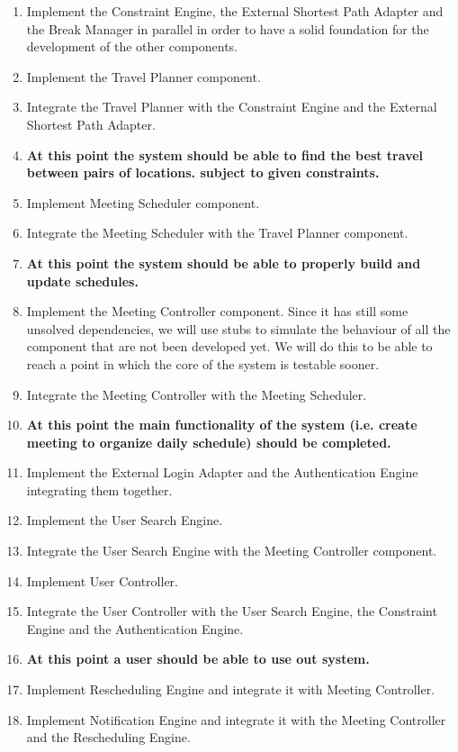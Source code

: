 \begin{enumerate}
	
	\item Implement the Constraint Engine, the External Shortest Path Adapter and the Break Manager in parallel in order to have a solid foundation for the development of the other components.
	\item Implement the Travel Planner component.
	\item Integrate the Travel Planner with the Constraint Engine and the External Shortest Path Adapter.
	 \item[ ]
	\textbf{At this point the system should be able to find the best travel between pairs of locations. subject to given constraints.}
	 \item Implement Meeting Scheduler component. 
	 \item Integrate the Meeting Scheduler with the Travel Planner component.
	 \item[ ]
	\textbf{At this point the system should be able to properly build and update schedules.}
	 \item Implement the Meeting Controller component. Since it has still some unsolved dependencies, we will use stubs to simulate the behaviour of all the component that are not been developed yet. We will do this to be able to reach a point in which the core of the system is testable sooner.
	 \item Integrate the Meeting Controller with the Meeting Scheduler.
	 \item[ ]
	\textbf{At this point the main functionality of the system (i.e. create meeting to organize daily schedule) should be completed.}
	 \item Implement the External Login Adapter and the Authentication Engine integrating them together.
	 \item Implement the User Search Engine.
	 \item Integrate the User Search Engine with the Meeting Controller component.
	 \item Implement User Controller.
	 \item Integrate the User Controller with the User Search Engine, the Constraint Engine and the Authentication Engine.
	 \item[ ]
	\textbf{At this point a user should be able to use out system.}
	 \item Implement Rescheduling Engine and integrate it with Meeting Controller.
	 \item Implement Notification Engine and integrate it with the Meeting Controller and the Rescheduling Engine.

\end{enumerate}

